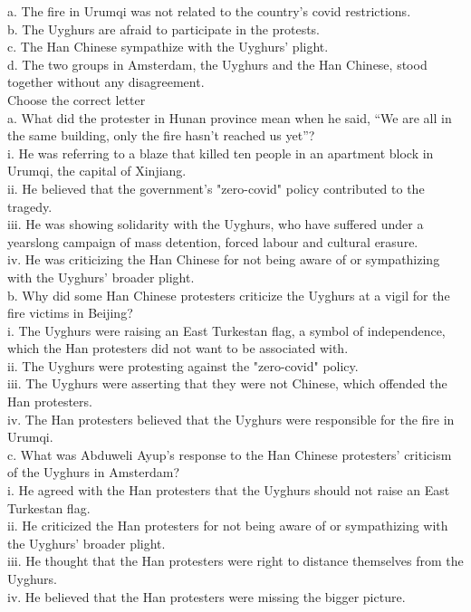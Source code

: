 \documentclass[10pt, a4paper, oneside]{article}
\begin{document}
\begin{spacing}{2.0}
a. The fire in Urumqi was not related to the country's covid restrictions.\\
b. The Uyghurs are afraid to participate in the protests.\\
c. The Han Chinese sympathize with the Uyghurs' plight.\\
d. The two groups in Amsterdam, the Uyghurs and the Han Chinese, stood together without any disagreement. \\

Choose the correct letter\\
a. What did the protester in Hunan province mean when he said, “We are all in the same building, only the fire hasn't reached us yet”?\\
i. He was referring to a blaze that killed ten people in an apartment block in Urumqi, the capital of Xinjiang.\\
ii. He believed that the government's "zero-covid" policy contributed to the tragedy.\\
iii. He was showing solidarity with the Uyghurs, who have suffered under a yearslong campaign of mass detention, 
forced labour and cultural erasure.\\
iv. He was criticizing the Han Chinese for not being aware of or sympathizing with the Uyghurs' broader plight.\\

b. Why did some Han Chinese protesters criticize the Uyghurs at a vigil for the fire victims in Beijing?\\
i. The Uyghurs were raising an East Turkestan flag, a symbol of independence, which the Han protesters did not want to be associated with.\\
ii. The Uyghurs were protesting against the "zero-covid" policy.\\
iii. The Uyghurs were asserting that they were not Chinese, which offended the Han protesters.\\
iv. The Han protesters believed that the Uyghurs were responsible for the fire in Urumqi.\\

c. What was Abduweli Ayup's response to the Han Chinese protesters' criticism of the Uyghurs in Amsterdam?\\
i. He agreed with the Han protesters that the Uyghurs should not raise an East Turkestan flag.\\
ii. He criticized the Han protesters for not being aware of or sympathizing with the Uyghurs' broader plight.\\
iii. He thought that the Han protesters were right to distance themselves from the Uyghurs.\\
iv. He believed that the Han protesters were missing the bigger picture.\\


\end{spacing}
\end{document}
